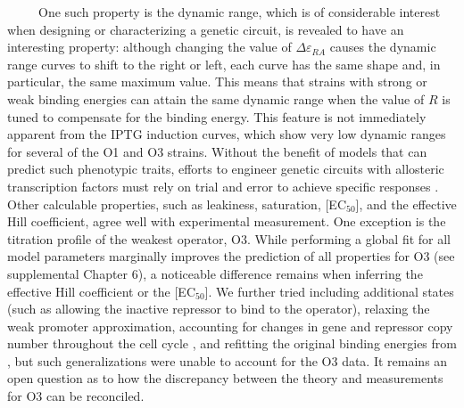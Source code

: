 \documentclass[12pt]{caltech_thesis}
\begin{document}
~~~~~One such property is the dynamic range, which is of considerable
interest when designing or characterizing a genetic circuit, is revealed
to have an interesting property: although changing the value of
\(\Delta \varepsilon_{RA}\) causes the dynamic range curves to shift to
the right or left, each curve has the same shape and, in particular, the
same maximum value. This means that strains with strong or weak binding
energies can attain the same dynamic range when the value of \(R\) is
tuned to compensate for the binding energy. This feature is not
immediately apparent from the IPTG induction curves, which show very low
dynamic ranges for several of the O1 and O3 strains. Without the benefit
of models that can predict such phenotypic traits, efforts to engineer
genetic circuits with allosteric transcription factors must rely on
trial and error to achieve specific responses
\autocite{rogers2015,rohlhill2017}. Other calculable properties, such as
leakiness, saturation, {[}EC\(_{50}\){]}, and the effective Hill
coefficient, agree well with experimental measurement. One exception is
the titration profile of the weakest operator, O3. While performing a
global fit for all model parameters marginally improves the prediction
of all properties for O3 (see supplemental Chapter 6), a noticeable
difference remains when inferring the effective Hill coefficient or the
{[}EC\(_{50}\){]}. We further tried including additional states (such as
allowing the inactive repressor to bind to the operator), relaxing the
weak promoter approximation, accounting for changes in gene and
repressor copy number throughout the cell cycle \autocite{jones2014},
and refitting the original binding energies from \textcite{garcia2011},
but such generalizations were unable to account for the O3 data. It
remains an open question as to how the discrepancy between the theory
and measurements for O3 can be reconciled.
\end{document}
